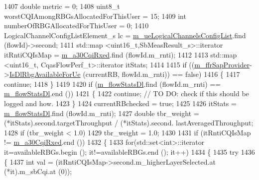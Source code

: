 \begin{DoxyCode}
1407               \textcolor{keywordtype}{double} metric = 0;
1408               uint8\_t worstCQIAmongRBGsAllocatedForThisUser = 15;
1409               \textcolor{keywordtype}{int} numberOfRBGAllocatedForThisUser = 0;
1410               LogicalChannelConfigListElement\_s lc = 
      \hyperlink{classns3_1_1CqaFfMacScheduler_a2e7fafcc959bf531979bc041782ac5b1}{m\_ueLogicalChannelsConfigList}.find (flowId)->second;
1411               std::map <uint16\_t,SbMeasResult\_s>::iterator itRntiCQIsMap = 
      \hyperlink{classns3_1_1CqaFfMacScheduler_a6894c40af99f8d6c6fdb201e7363fde9}{m\_a30CqiRxed}.find (flowId.m\_rnti);
1412 
1413               std::map <uint16\_t, CqasFlowPerf\_t>::iterator itStats;
1414 
1415               \textcolor{keywordflow}{if} ((\hyperlink{classns3_1_1CqaFfMacScheduler_a47eeb31f5d284b045d6deba40ac3e108}{m\_ffrSapProvider}->\hyperlink{classns3_1_1LteFfrSapProvider_a91f4de3c794d2a32fae5bcfafd88b6fa}{IsDlRbgAvailableForUe} (currentRB,
       flowId.m\_rnti)) == \textcolor{keyword}{false})
1416                 \{
1417                   \textcolor{keywordflow}{continue};
1418                 \}
1419 
1420               \textcolor{keywordflow}{if} (\hyperlink{classns3_1_1CqaFfMacScheduler_a1cf6c47e55cbcfb9c28b17c242bde972}{m\_flowStatsDl}.find (flowId.m\_rnti) == 
      \hyperlink{classns3_1_1CqaFfMacScheduler_a1cf6c47e55cbcfb9c28b17c242bde972}{m\_flowStatsDl}.end ())
1421                 \{
1422                   \textcolor{keywordflow}{continue};                               \textcolor{comment}{// TO DO:  check if this should be logged and
       how.}
1423                 \}
1424               currentRBchecked = \textcolor{keyword}{true};
1425 
1426               itStats = \hyperlink{classns3_1_1CqaFfMacScheduler_a1cf6c47e55cbcfb9c28b17c242bde972}{m\_flowStatsDl}.find (flowId.m\_rnti);
1427               \textcolor{keywordtype}{double} tbr\_weight = (*itStats).second.targetThroughput / (*itStats).second.
      lastAveragedThroughput;
1428               \textcolor{keywordflow}{if} (tbr\_weight < 1.0)
1429                 tbr\_weight = 1.0;
1430 
1431               \textcolor{keywordflow}{if} (itRntiCQIsMap != \hyperlink{classns3_1_1CqaFfMacScheduler_a6894c40af99f8d6c6fdb201e7363fde9}{m\_a30CqiRxed}.end ())
1432                 \{
1433                   \textcolor{keywordflow}{for}(std::set<int>::iterator it=availableRBGs.begin (); it!=availableRBGs.end (); it++)
1434                     \{
1435                       \textcolor{keywordflow}{try}
1436                         \{
1437                           \textcolor{keywordtype}{int} val = (itRntiCQIsMap->second.m\_higherLayerSelected.at (*it).m\_sbCqi.at (0));

\end{DoxyCode}
